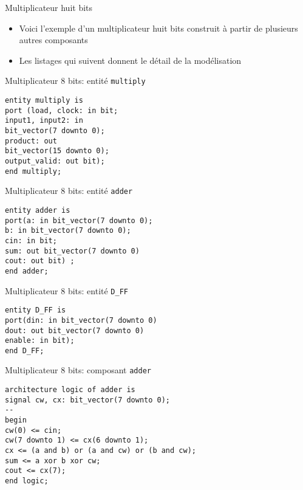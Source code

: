 \documentclass[presentation]{beamer}
\begin{document}
\begin{frame}[label={sec:orgb17e98b}]{Multiplicateur huit bits}
\begin{itemize}
\item Voici l'exemple d'un multiplicateur huit bits construit à partir de plusieurs autres composants
\item Les listages qui suivent donnent le détail de la modélisation
\end{itemize}
\end{frame}

\begin{frame}[label={sec:orgacee3ad},fragile]{Multiplicateur 8 bits: entité \texttt{multiply}}
 \begin{verbatim}
entity multiply is
port (load, clock: in bit;
input1, input2: in
bit_vector(7 downto 0);
product: out
bit_vector(15 downto 0);
output_valid: out bit);
end multiply;

\end{verbatim}
\end{frame}

\begin{frame}[label={sec:org7d473ae},fragile]{Multiplicateur 8 bits: entité \texttt{adder}}
 \begin{verbatim}
entity adder is
port(a: in bit_vector(7 downto 0);
b: in bit_vector(7 downto 0);
cin: in bit;
sum: out bit_vector(7 downto 0)
cout: out bit) ;
end adder;
\end{verbatim}
\end{frame}


\begin{frame}[label={sec:org6f268f2},fragile]{Multiplicateur 8 bits: entité \texttt{D\_FF}}
 \begin{verbatim}
entity D_FF is
port(din: in bit_vector(7 downto 0)
dout: out bit_vector(7 downto 0)
enable: in bit);
end D_FF;
\end{verbatim}
\end{frame}

\begin{frame}[label={sec:org8b1ece7},fragile]{Multiplicateur 8 bits: composant \texttt{adder}}
 \begin{verbatim}
architecture logic of adder is
signal cw, cx: bit_vector(7 downto 0);
--
begin
cw(0) <= cin;
cw(7 downto 1) <= cx(6 downto 1);
cx <= (a and b) or (a and cw) or (b and cw);
sum <= a xor b xor cw;
cout <= cx(7);
end logic;
\end{verbatim}
\end{frame}
\end{document}
